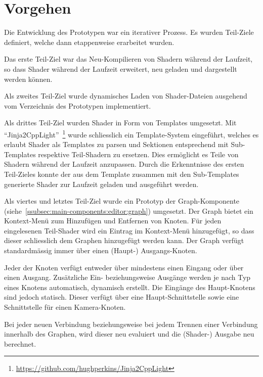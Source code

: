 
\section{Vorgehen}
\label{sec:prototype:procedure}

Die Entwicklung des Prototypen war ein iterativer Prozess. Es wurden Teil-Ziele
definiert, welche dann etappenweise erarbeitet wurden.

Das erste Teil-Ziel war das Neu-Kompilieren von Shadern während der Laufzeit,
so dass Shader während der Laufzeit erweitert, neu geladen und dargestellt
werden können.

Als zweites Teil-Ziel wurde dynamisches Laden von Shader-Dateien ausgehend vom
Verzeichnis des Prototypen implementiert.

Als drittes Teil-Ziel wurden Shader in Form von Templates umgesetzt. Mit
``Jinja2CppLight''~\footnote{\href{https://github.com/hughperkins/Jinja2CppLight}{https://github.com/hughperkins/Jinja2CppLight}}
wurde schliesslich ein Template-System eingeführt, welches es erlaubt Shader
als Templates zu parsen und Sektionen entsprechend mit Sub-Templates respektive
Teil-Shadern zu ersetzen.  Dies ermöglicht es Teile von Shadern während der
Laufzeit anzupassen. Durch die Erkenntnisse des ersten Teil-Zieles konnte der
aus dem Template zusammen mit den Sub-Templates generierte Shader zur Laufzeit
geladen und ausgeführt werden.

Als viertes und letztes Teil-Ziel wurde ein Prototyp der Graph-Komponente
(siehe~\ref{ssubsec:main-components:editor:graph}) umgesetzt. Der Graph bietet
ein Kontext-Menü zum Hinzufügen und Entfernen von Knoten. Für jeden
eingelesenen Teil-Shader wird ein Eintrag im Kontext-Menü hinzugefügt, so dass
dieser schliesslich dem Graphen hinzugefügt werden kann. Der Graph verfügt
standardmässig immer über einen (Haupt-) Ausgangs-Knoten.

Jeder der Knoten verfügt entweder über mindestens einen Eingang oder über einen
Ausgang.  Zusätzliche Ein- beziehungsweise Ausgänge werden je nach Typ eines
Knotens automatisch, dynamisch erstellt. Die Eingänge des Haupt-Knotens sind
jedoch statisch. Dieser verfügt über eine Haupt-Schnittstelle sowie eine
Schnittstelle für einen Kamera-Knoten.

Bei jeder neuen Verbindung beziehungsweise bei jedem Trennen einer Verbindung
innerhalb des Graphen, wird dieser neu evaluiert und die (Shader-) Ausgabe neu
berechnet.

